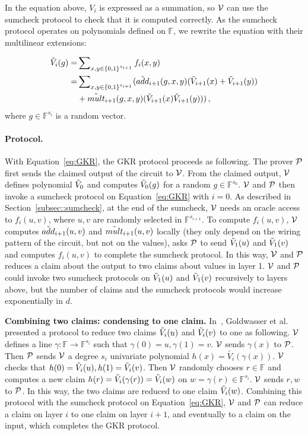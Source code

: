 In the equation above, $V_i$ is expressed as a summation, so $\V$ can use the sumcheck protocol to check that it is computed correctly. As the sumcheck protocol operates on polynomials defined on $\mathbb{F}$, we rewrite the equation with their multilinear extensions:

\begin{align}\label{eq:GKR}
\tV_i(g)=&\sum\nolimits_{x, y \in\binary^{s_{i+1}}}f_i(x,y)\nonumber\\
=&\sum\nolimits_{x, y \in\binary^{s_{i+1}}}(\tadd_{i+1}(g,x,y)(\tV_{i+1}(x)+\tV_{i+1}(y))\nonumber\\
&+\tmult_{i+1}(g,x,y)(\tV_{i+1}(x)\tV_{i+1}(y)))\,,
\end{align}
where $g\in\mathbb{F}^{s_i}$ is a random vector. 

\paragraph{Protocol.} With Equation~\ref{eq:GKR}, the GKR protocol proceeds as following. The prover $\P$ first sends the claimed output of the circuit to $\V$. From the claimed output, $\V$ defines polynomial $\tV_0$ and computes $\tV_0(g)$ for a random $g\in\mathbb{F}^{s_0}$. $\V$ and $\P$ then invoke a sumcheck protocol on Equation~\ref{eq:GKR} with $i=0$. As described in Section~\ref{subsec::sumcheck}, at the end of the sumcheck, $\V$ needs an oracle access to $f_i(u,v)$, where $u,v$ are randomly selected in $\mathbb{F}^{s_{i+1}}$. To compute $f_i(u,v)$, $\V$ computes $\tadd_{i+1}(u,v)$ and $\tmult_{i+1}(u,v)$ locally (they only depend on the wiring pattern of the circuit, but not on the values), asks $\P$ to send $\tV_1(u)$ and $\tV_1(v)$ and computes $f_i(u,v)$ to complete the sumcheck protocol. In this way, $\V$ and $\P$ reduces a claim about the output to two claims about values in layer 1. $\V$ and $\P$ could invoke two sumcheck protocols on $\tV_1(u)$ and $\tV_1(v)$ recursively to layers above, but the number of claims and the sumcheck protocols would increase exponentially in $d$. 

\smallskip\noindent\textbf{Combining two claims: condensing to one claim.} In~\cite{GKR}, Goldwasser et al. presented a protocol to reduce two claims $\tV_i(u)$ and $\tV_i(v)$ to one as following. $\V$ defines a line $\gamma: \mathbb{F} \rightarrow \mathbb{F}^{s_i}$ such that $\gamma(0)=u, \gamma(1)=v$. $\V$ sends $\gamma(x)$ to $\P$. Then $\P$ sends $\V$ a degree $s_i$ univariate polynomial $h(x)=\tilde{V_i}(\gamma(x))$. $\V$ checks that $h(0)=\tV_i(u), h(1)=\tV_i(v)$. Then $\V$ randomly chooses $r\in\mathbb{F}$ and computes a new claim $h(r) = \tV_i(\gamma(r)) = \tV_i(w)$ on $w=\gamma(r) \in \mathbb{F}^{s_i}$. $\V$ sends $r, w$ to $\P$. In this way, the two claims are reduced to one claim $\tV_i(w)$. Combining this protocol with the sumcheck protocol on Equation~\ref{eq:GKR}, $\V$ and $\P$ can reduce a claim on layer $i$ to one claim on layer $i+1$, and eventually to a claim on the input, which completes the GKR protocol.




